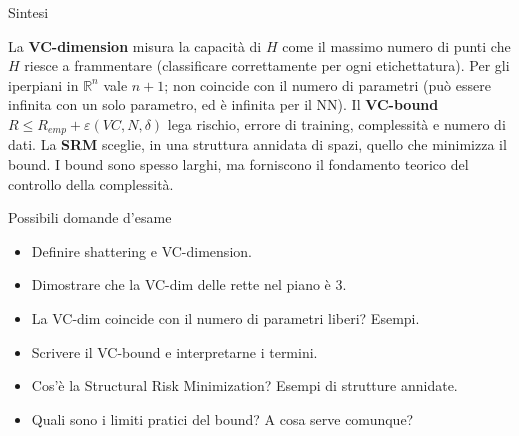 \begin{boxabstract}{Sintesi}

La \textbf{VC-dimension} misura la capacità di \(H\) come il massimo
numero di punti che \(H\) riesce a frammentare (classificare
correttamente per ogni etichettatura). Per gli iperpiani in
\(\mathbb{R}^n\) vale \(n+1\); non coincide con il numero di parametri
(può essere infinita con un solo parametro, ed è infinita per il NN). Il
\textbf{VC-bound} \(R \le R_{emp} + \varepsilon(VC, N, \delta)\) lega
rischio, errore di training, complessità e numero di dati. La
\textbf{SRM} sceglie, in una struttura annidata di spazi, quello che
minimizza il bound. I bound sono spesso larghi, ma forniscono il
fondamento teorico del controllo della complessità.

\end{boxabstract}

\begin{boxquestion}{Possibili domande d'esame}

\begin{itemize}
\tightlist
\item
  Definire shattering e VC-dimension.
\item
  Dimostrare che la VC-dim delle rette nel piano è 3.
\item
  La VC-dim coincide con il numero di parametri liberi? Esempi.
\item
  Scrivere il VC-bound e interpretarne i termini.
\item
  Cos'è la Structural Risk Minimization? Esempi di strutture annidate.
\item
  Quali sono i limiti pratici del bound? A cosa serve comunque?
\end{itemize}

\end{boxquestion}
